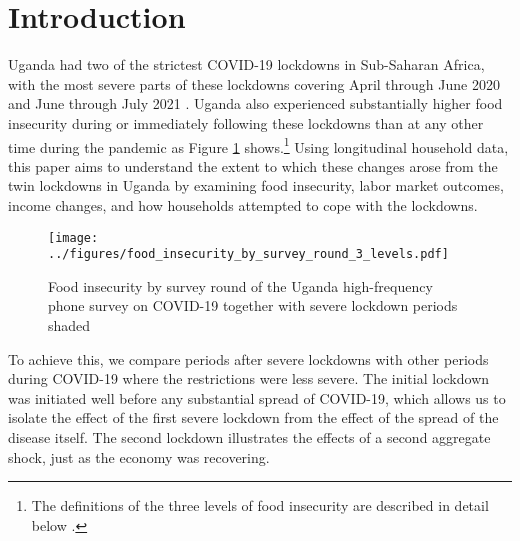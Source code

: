 \documentclass{wber}
\begin{document}


\maketitle

\section{Introduction}\label{introduction}

Uganda had two of the strictest COVID-19 lockdowns in Sub-Saharan
Africa, with the most severe parts of these lockdowns covering April
through June 2020 and June through July 2021
\citep{BBC2020, Birner2021, Mahmud2021}. 
Uganda also experienced substantially higher food insecurity during or 
immediately following these lockdowns than at any other time during the 
pandemic as Figure \ref{fig:raw-insecurity} shows.\footnote{The
  definitions of the three levels of food insecurity are described in
  detail below \citep{FAO2015}.} Using longitudinal household data, this
paper aims to understand the extent to which these changes arose from
the twin lockdowns in Uganda by examining food insecurity, labor market
outcomes, income changes, and how households attempted to cope with the
lockdowns.

\begin{figure}
\centering
\texttt{[image: ../figures/food\_insecurity\_by\_survey\_round\_3\_levels.pdf]}
\caption{Food insecurity by survey round of the Uganda high-frequency
phone survey on COVID-19 together with severe lockdown periods
shaded}\label{fig:raw-insecurity}
\end{figure}

To achieve this, we compare periods after severe lockdowns with other
periods during COVID-19 where the restrictions were less severe. The
initial lockdown was initiated well before any substantial spread of
COVID-19, which allows us to isolate the effect of the first severe
lockdown from the effect of the spread of the disease itself. The second
lockdown illustrates the effects of a second aggregate shock, just as
the economy was recovering.
\end{document}
